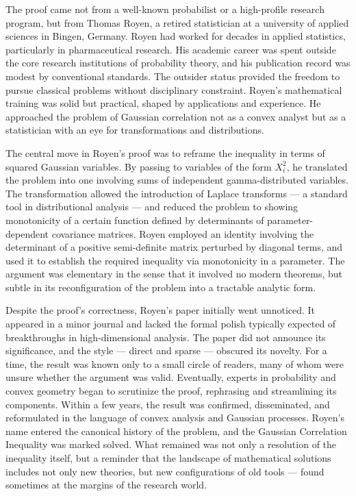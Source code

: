 The proof came not from a well-known probabilist or a high-profile research program, but from Thomas Royen, a retired statistician at a university of applied sciences in Bingen, Germany. Royen had worked for decades in applied statistics, particularly in pharmaceutical research. His academic career was spent outside the core research institutions of probability theory, and his publication record was modest by conventional standards. The outsider status provided the freedom to pursue classical problems without disciplinary constraint. Royen's mathematical training was solid but practical, shaped by applications and experience. He approached the problem of Gaussian correlation not as a convex analyst but as a statistician with an eye for transformations and distributions.

The central move in Royen's proof was to reframe the inequality in terms of squared Gaussian variables. By passing to variables of the form \( X_i^2 \), he translated the problem into one involving sums of independent gamma-distributed variables. The transformation allowed the introduction of Laplace transforms — a standard tool in distributional analysis — and reduced the problem to showing monotonicity of a certain function defined by determinants of parameter-dependent covariance matrices. Royen employed an identity involving the determinant of a positive semi-definite matrix perturbed by diagonal terms, and used it to establish the required inequality via monotonicity in a parameter. The argument was elementary in the sense that it involved no modern theorems, but subtle in its reconfiguration of the problem into a tractable analytic form.

Despite the proof’s correctness, Royen’s paper initially went unnoticed. It appeared in a minor journal and lacked the formal polish typically expected of breakthroughs in high-dimensional analysis. The paper did not announce its significance, and the style — direct and sparse — obscured its novelty. For a time, the result was known only to a small circle of readers, many of whom were unsure whether the argument was valid. Eventually, experts in probability and convex geometry began to scrutinize the proof, rephrasing and streamlining its components. Within a few years, the result was confirmed, disseminated, and reformulated in the language of convex analysis and Gaussian processes. Royen’s name entered the canonical history of the problem, and the Gaussian Correlation Inequality was marked solved. What remained was not only a resolution of the inequality itself, but a reminder that the landscape of mathematical solutions includes not only new theories, but new configurations of old tools — found sometimes at the margins of the research world.
\newpage

